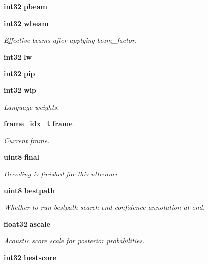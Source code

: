 \begin{DoxyCompactItemize}
\item 
{\bf int32} {\bfseries pbeam}\label{structfsg__search__s_a373ffd62c4bcb07a6f28378ea33161e1}

\item 
{\bf int32} {\bf wbeam}\label{structfsg__search__s_af28ddecbb5115a50712c61f8a72dcf51}

\begin{DoxyCompactList}\small\item\em \-Effective beams after applying beam\-\_\-factor. \end{DoxyCompactList}\item 
{\bf int32} {\bfseries lw}\label{structfsg__search__s_a77c1f7f228ca66e48fb05e1ac2b2714a}

\item 
{\bf int32} {\bfseries pip}\label{structfsg__search__s_a2163d2c02c2dfe84a83c10fdb2d330a3}

\item 
{\bf int32} {\bf wip}\label{structfsg__search__s_ae9ddc3b50d0f164926392f8ab4b019a0}

\begin{DoxyCompactList}\small\item\em \-Language weights. \end{DoxyCompactList}\item 
{\bf frame\-\_\-idx\-\_\-t} {\bf frame}
\begin{DoxyCompactList}\small\item\em \-Current frame. \end{DoxyCompactList}\item 
{\bf uint8} {\bf final}
\begin{DoxyCompactList}\small\item\em \-Decoding is finished for this utterance. \end{DoxyCompactList}\item 
{\bf uint8} {\bf bestpath}
\begin{DoxyCompactList}\small\item\em \-Whether to run bestpath search and confidence annotation at end. \end{DoxyCompactList}\item 
{\bf float32} {\bf ascale}
\begin{DoxyCompactList}\small\item\em \-Acoustic score scale for posterior probabilities. \end{DoxyCompactList}\item 
{\bf int32} {\bf bestscore}\label{structfsg__search__s_a52880ad440412d76f7aae7e05977ba4b}


\end{DoxyCompactItemize}
